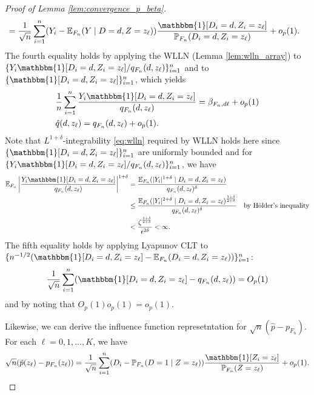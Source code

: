 \documentclass[11pt]{article}
\theoremstyle{definition}
\newcommand{\Exp}{\ensuremath{\mathbb{E}}} %
\newcommand{\Prob}{\ensuremath{\mathbb{P}}} %
\newcommand{\0}{\ensuremath{\mathbf{0}}}
\newcommand{\indicator}{\ensuremath{\mathbbm{1}}}
\begin{document}
\begin{bibunit}
\begin{proof}[Proof of Lemma \ref{lem:convergence_p_beta}]
{\begin{align*}
		&= \frac{1}{\sqrt{n}} \sum_{i=1}^n  (Y_i - \Exp_{F_n}(Y\mid D=d, Z=z_\ell)) \frac{\indicator[D_i = d, Z_i = z_\ell]}{\Prob_{F_n}(D_i = d, Z_i=z_\ell)} + o_p(1).
	\end{align*}}
	The fourth equality holds by applying the WLLN (Lemma \ref{lem:wlln_array}) to $\{Y_i \indicator[D_i = d, Z_i = z_\ell]/q_{F_n}(d,z_\ell)\}_{i=1}^n$ and to $\{\indicator[D_i=d, Z_i = z_\ell]\}_{i=1}^n$, which yields
	\begin{align*}
		& \frac{1}{n}\sum_{i=1}^n \frac{Y_i\indicator[D_i = d, Z_i=z_\ell]}{q_{F_n}(d,z_\ell)} = \beta_{F_n, d\ell} + o_p(1) \\
		& \hat{q}(d,z_\ell) = q_{F_n}(d,z_\ell) + o_p(1).
	\end{align*}
	Note that $L^{1+\delta}$-integrability \eqref{eq:wlln} required by WLLN holds here since $\{\indicator[D_i=d, Z_i = z_\ell]\}_{i=1}^n$ are uniformly bounded and for $\{Y_i \indicator[D_i = d, Z_i = z_\ell]/q_{F_n}(d,z_\ell)\}_{i=1}^n$, we have 
	\begin{align*}
		\Exp_{F_n}\left|\frac{Y_i\indicator[D_i = d, Z_i = z_\ell]}{q_{F_n}(d,z_\ell)}\right|^{1+\delta}
		&= \frac{\Exp_{F_n}(|Y_i|^{1+\delta} \mid D_i = d, Z_i = z_\ell)}{q_{F_n}(d,z_\ell)^{\delta}}	\\
		&\leq \frac{\Exp_{F_n}(|Y_i|^{2+\delta} \mid D_i = d, Z_i = z_\ell)^{\frac{1+\delta}{2+\delta}}}{q_{F_n}(d,z_\ell)^{\delta}} \quad \text{by H\"{o}lder's inequality}\\
		&<
		\frac{\zeta^{\frac{1+\delta}{2+\delta}}}{\epsilon^{2\delta}} < \infty.
	\end{align*}
	The fifth equality holds by applying Lyapunov CLT to $\{n^{-1/2}(\indicator[D_i = d, Z_i = z_\ell] - \Exp_{F_n}(D_i = d, Z_i = z_\ell))\}_{i=1}^n$:
	\[
		\frac{1}{\sqrt{n}}\sum_{i=1}^n (\indicator[D_i = d, Z_i = z_\ell] - q_{F_n}(d,z_\ell)) = O_p(1)
	\]
	and by noting that $O_p(1)o_p(1) = o_p(1)$.

	Likewise, we can derive the influence function represetntation for $\sqrt{n}(\hat{p} - p_{F_n})$. For each $\ell = 0,1,\ldots,K$, we have 
	\[
		\sqrt{n}(\hat{p}(z_\ell) - p_{F_n}(z_\ell)) = \frac{1}{\sqrt{n}} \sum_{i=1}^n (D_i - \Prob_{F_n}(D=1\mid Z=z_\ell))\frac{\indicator[Z_i = z_\ell]}{\Prob_{F_n}(Z = z_\ell)} + o_p(1).
	\]


\end{proof}
\end{bibunit}
\end{document}
